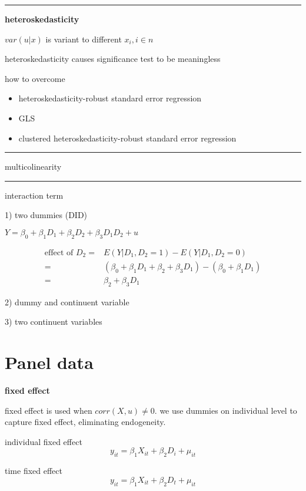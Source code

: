 \documentclass{article}
\providecommand{\tightlist}{
  \setlength{\itemsep}{0pt}
  \setlength{\parskip}{0pt}}
\newcommand*\sepline{%
  \begin{center}
    \rule[1ex]{.5\textwidth}{.5pt}
  \end{center}}
\begin{document}
\sepline

\textbf{heteroskedasticity}

$var(u|x)$ is variant to different $x_i, i\in n$

heteroskedasticity causes significance test to be meaningless

how to overcome

\begin{itemize}
\tightlist
  \item heteroskedasticity-robust standard error regression
  \item GLS
  \item clustered heteroskedasticity-robust standard error regression
\end{itemize}

\sepline

multicolinearity

\sepline

interaction term

1) two dummies (DID)

$Y=\beta_0+\beta_{1}D_1+\beta_{2}D_2+\beta_{3}D_1 D_2+u$

\begin{equation}
  \begin{split}
  \text{effect of $D_2$}=&E(Y|D_1,D_2=1)-E(Y|D_1,D_2=0)\\
  =&(\beta_0+\beta_{1}D_1+\beta_{2}+\beta_{3}D_1)-(\beta_0+\beta_{1}D_1)
  \\=&\beta_2+\beta_3 D_1
  \end{split}
\end{equation}

2) dummy and continuent variable


3) two continuent variables



\section{Panel data}

\textbf{fixed effect}

fixed effect is used when $corr(X,u)\neq 0$. we use dummies on individual level to capture fixed effect, eliminating endogeneity.

individual fixed effect
\begin{equation}
  y_{it}=\beta_1 X_{it}+\beta_2D_i+\mu_{it}
\end{equation}

time fixed effect
\begin{equation}
  y_{it}=\beta_1 X_{it}+\beta_2D_t+\mu_{it}
\end{equation}
\end{document}
